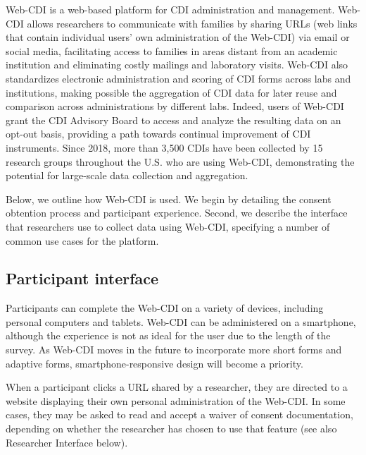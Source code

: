 \documentclass[
  english,
  ,man,floatsintext]{apa6}
\begin{document}
Web-CDI is a web-based platform for CDI administration and management. Web-CDI allows researchers to communicate with families by sharing URLs (web links that contain individual users' own administration of the Web-CDI) via email or social media, facilitating access to families in areas distant from an academic institution and eliminating costly mailings and laboratory visits. Web-CDI also standardizes electronic administration and scoring of CDI forms across labs and institutions, making possible the aggregation of CDI data for later reuse and comparison across administrations by different labs. Indeed, users of Web-CDI grant the CDI Advisory Board to access and analyze the resulting data on an opt-out basis, providing a path towards continual improvement of CDI instruments. Since 2018, more than 3,500 CDIs have been collected by 15 research groups throughout the U.S. who are using Web-CDI, demonstrating the potential for large-scale data collection and aggregation.

Below, we outline how Web-CDI is used. We begin by detailing the consent obtention process and participant experience. Second, we describe the interface that researchers use to collect data using Web-CDI, specifying a number of common use cases for the platform.

\hypertarget{participant-interface}{%
\subsection{Participant interface}\label{participant-interface}}

Participants can complete the Web-CDI on a variety of devices, including personal computers and tablets. Web-CDI can be administered on a smartphone, although the experience is not as ideal for the user due to the length of the survey. As Web-CDI moves in the future to incorporate more short forms and adaptive forms, smartphone-responsive design will become a priority.

When a participant clicks a URL shared by a researcher, they are directed to a website displaying their own personal administration of the Web-CDI. In some cases, they may be asked to read and accept a waiver of consent documentation, depending on whether the researcher has chosen to use that feature (see also Researcher Interface below).
\end{document}
